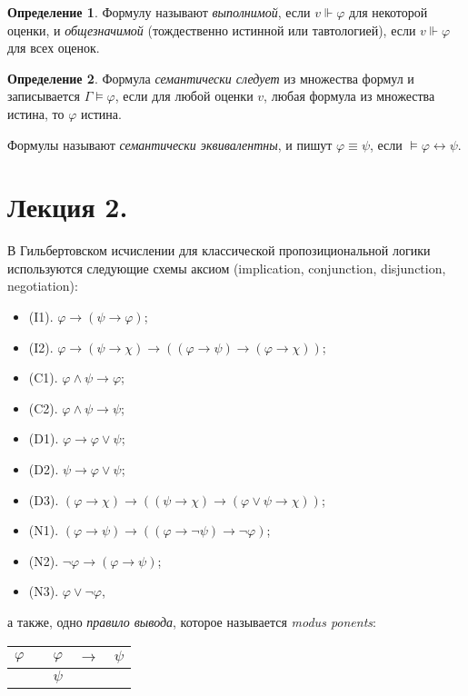 \documentclass[a4paper,100pt]{article}
\theoremstyle{indented}
\theoremstyle{definition}
\newtheorem{defn}{Определение}
\theoremstyle{remark}
\begin{document}
\begin{defn}
  Формулу называют \textit{выполнимой}, если $v \Vdash \varphi$ для некоторой оценки, и \textit{общезначимой} (тождественно истинной или тавтологией), если $v \Vdash \varphi$ для всех оценок.
\end{defn}

\begin{defn}
  Формула \textit{семантически следует} из множества формул и записывается $\Gamma \vDash \varphi$, если для любой оценки $v$, любая формула из множества истина, то $\varphi$ истина.  \ 
  
  Формулы называют \textit{семантически эквивалентны}, и пишут $\varphi \equiv \psi$, если $\vDash \varphi \leftrightarrow \psi$. 
\end{defn}


\section{Лекция 2.}

В Гильбертовском исчислении для классической пропозициональной логики используются следующие схемы аксиом (implication, conjunction, disjunction, negotiation): 

\begin{itemize}
  \item (I1). $\varphi\rightarrow (\psi\rightarrow \varphi)$;
  \item (I2). $\varphi\rightarrow (\psi\rightarrow \chi)\rightarrow((\varphi\rightarrow \psi)\rightarrow (\varphi\rightarrow \chi))$; 
  \item (C1). $\varphi \wedge \psi \rightarrow \varphi$; 
  \item (C2). $\varphi \wedge \psi \rightarrow \psi$; 
  \item (D1). $\varphi\rightarrow \varphi \vee\psi$;
  \item (D2). $\psi\rightarrow \varphi \vee \psi$; 
  \item (D3). $(\varphi\rightarrow \chi)\rightarrow((\psi\rightarrow \chi)\rightarrow (\varphi\vee\psi\rightarrow\chi))$;
  \item (N1). $(\varphi\rightarrow \psi)\rightarrow((\varphi\rightarrow \neg \psi)\rightarrow \neg \varphi)$; 
  \item (N2). $\neg\varphi \rightarrow (\varphi\rightarrow \psi)$; 
  \item (N3). $\varphi \vee \neg \varphi$, 
\end{itemize}

а также, одно \textit{правило вывода}, которое называется \textit{modus ponents}:

\begin{center}
  \begin{tabular}{c c c c c}
    $\varphi$ & & $\varphi$ & $\rightarrow$ & $\psi$ \\ 
    \hline
    & & $\psi$ & & 
  \end{tabular}
\end{center}
\end{document}

